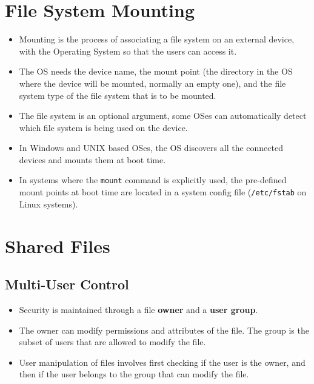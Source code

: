 \documentclass{article}
\theoremstyle{plain}
\theoremstyle{definition}
\begin{document}
\section{File System Mounting}
\begin{itemize}
    \item Mounting is the process of associating a file system on an external device, with the Operating System so that the users can access it.
    
    \item The OS needs the device name, the mount point (the directory in the OS where the device will be mounted, normally an empty one), and the file system type of the file system that is to be mounted. 
    
    \item The file system is an optional argument, some OSes can automatically detect which file system is being used on the device. 
    
    \item In Windows and UNIX based OSes, the OS discovers all the connected devices and mounts them at boot time. 
    
    \item In systems where the \texttt{mount} command is explicitly used, the pre-defined mount points at boot time are located in a system config file (\texttt{/etc/fstab} on Linux systems). 
\end{itemize}

\section{Shared Files}
\subsection{Multi-User Control}
\begin{itemize}
    \item Security is maintained through a file \textbf{owner} and a \textbf{user group}.
    
    \item The owner can modify permissions and attributes of the file. The group is the subset of users that are allowed to modify the file. 
    
    \item User manipulation of files involves first checking if the user is the owner, and then if the user belongs to the group that can modify the file. 
\end{itemize}
\end{document}
